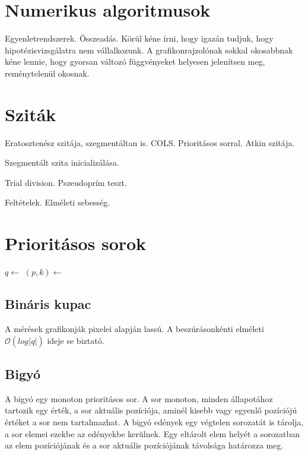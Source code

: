 \documentclass[12pt]{report}
\begin{document}
\section{Numerikus algoritmusok}

Egyenletrendszerek. Összeadás.
Körül kéne írni, hogy igazán tudjuk, hogy hipotézisvizsgálatra nem vállalkozunk.
A grafikonrajzolónak sokkal okosabbnak kéne lennie, hogy gyorsan változó függvényeket
helyesen jelenítsen meg, reménytelenül okosnak.

\section{Sziták}

Eratosztenész szitája, szegmentáltan is. COLS. Prioritásos sorral. Atkin szitája.

Szegmentált szita inicializálása.

Trial division. Pszeudoprím teszt.

Feltételek. Elméleti sebesség.

\section{Prioritásos sorok}

\begin{algorithmic}[1]
\State $q \gets$ 
		\State $(p, k) \gets $ 
		\State {}
		\State {}
	\EndWhile
		\State {}
	\EndIf
\EndFor
\end{algorithmic}

\subsection{Bináris kupac}

A mérések grafikonják pixelei alapján lassú. A beszúrásonkénti elméleti
$\mathcal{O}(log_{}{|q|})$ ideje se biztató.

\subsection{Bigyó} %

A bigyó egy monoton prioritásos sor.
A sor monoton, minden állapotához tartozik egy érték, a sor aktuális pozíciója,
aminél kisebb vagy egyenlő pozíciójú értéket a sor nem tartalmazhat.
A bigyó edények egy végtelen sorozatát is tárolja, a sor elemei ezekbe az edényekbe kerülnek.
Egy eltárolt elem helyét a sorozatban az elem pozíciójának
és a sor aktuális pozíciójának távolsága határozza meg.
\end{document}
